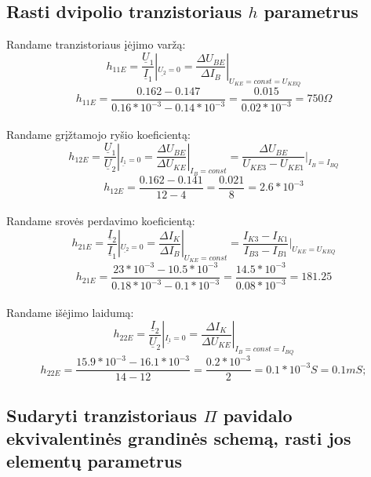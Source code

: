 \documentclass[11pt,a4paper]{article}
\begin{document}
\subsection{Rasti dvipolio tranzistoriaus $h$ parametrus}
Randame tranzistoriaus įėjimo varžą:
\begin{equation}
h_{11E} = \frac{\underline{U}_1}{\underline{I}_1}|_{\underline{U_2} = 0}
= \frac{\Delta U_{BE}}{\Delta I_B}|_{U_{KE} = const = U_{KEQ}}
\end{equation}
\[
h_{11E} = \frac{0.162-0.147}{0.16*10^{-3}-0.14*10^{-3}} = \frac{0.015}{0.02*10^{-3}} = 750 \Omega
\]\\
Randame grįžtamojo ryšio koeficientą:
\begin{equation}
h_{12E} = \frac{\underline{U}_1}{\underline{U}_2}|_{\underline{I_{1}} = 0} = \frac{\Delta U_{BE}}{\Delta U_{KE}}|_{I_{B} = const} = \frac{\Delta U_{BE}}{U_{KE3} - U_{KE1}} |_{I_B = I_{BQ}}
\end{equation}
\[
h_{12E} = \frac{0.162-0.141}{12-4} = \frac{0.021}{8} = 2.6*10^{-3}
\]\\
Randame srovės perdavimo koeficientą:
\begin{equation}
h_{21E} = \frac{\underline{I}_2}{\underline{I}_1} |_{\underline{U_{2}} = 0} = 
\frac{\Delta I_{K}}{\Delta I_{B}} |_{U_{KE} = const} = 
\frac{I_{K3} - I_{K1}}{I_{B3} - I_{B1}} |_{U_{KE} = U_{KEQ}}
\end{equation}
\[
h_{21E} = \frac{23*10^{-3}-10.5*10^{-3}}{0.18*10^{-3}-0.1*10^{-3}} = \frac{14.5*10^{-3}}{0.08*10^{-3}} = 181.25
\]\\
Randame išėjimo laidumą:
\begin{equation}
h_{22E} = \frac{\underline{I}_2}{\underline{U}_2} |_{\underline{I_1} = 0} = \frac{\Delta I_K}{\Delta U_{KE}} |_{I_B = const = I_{BQ}}
\end{equation}
\[
h_{22E} = \frac{15.9*10^{-3}-16.1*10^{-3}}{14-12} = \frac{0.2*10^{-3}}{2} = 0.1*10^{-3} S = 0.1 mS;
\]

\subsection{Sudaryti tranzistoriaus $\Pi$ pavidalo ekvivalentinės grandinės schemą, rasti jos elementų parametrus}
\end{document}

